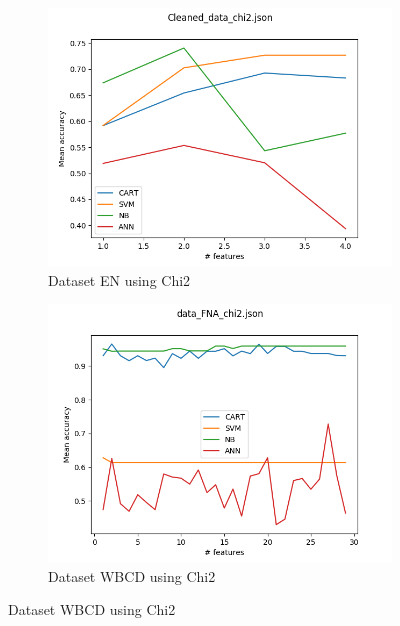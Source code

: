 \begin{figure}[htbp!]
  \centering
  \begin{subfigure}[b]{0.475\textwidth}
      \centering
      \includegraphics[width=\textwidth]{../plots_1d/Cleaned_data_chi2_combined.png}
      \caption[]%
      {{\small Dataset EN using Chi2}}
      \label{fig:EN_chi2}
  \end{subfigure}
  \hfill
  \begin{subfigure}[b]{0.475\textwidth}
      \centering
      \includegraphics[width=\textwidth]{../plots_1d/data_FNA_chi2_combined.png}
      \caption[]%
      {{\small Dataset WBCD using Chi2}}
      \label{fig:WBCD_chi2}
  \end{subfigure}

\end{figure}
